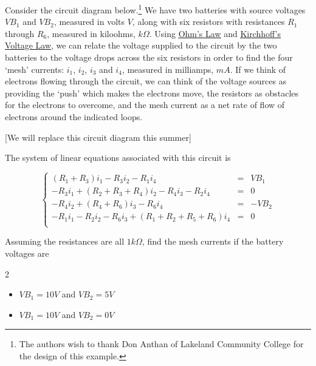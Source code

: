 \documentclass{ximera}
\begin{document}
\begin{example} \label{circuitex} Consider the circuit diagram below.\footnote{The authors wish to thank Don Anthan of Lakeland Community College for the design of this example.}   We have two batteries with source voltages $V\!B_1$ and $V\!B_2$, measured in volts $V$, along with six resistors with resistances $R_1$ through $R_6$, measured in kiloohms, $k\Omega$.  Using \href{http://en.wikipedia.org/wiki/Ohm's_law}{\underline{Ohm's Law}}   and \href{http://en.wikipedia.org/wiki/Kirchhoff's_circuit_laws}{\underline{Kirchhoff's Voltage Law}}, we can relate the voltage supplied to the circuit by the two batteries to the voltage drops across the six resistors in order to find the four `mesh' currents: $i_1$, $i_2$, $i_3$ and $i_4$, measured in milliamps, $mA$.  If we think of electrons flowing through the circuit, we can think of the voltage sources as providing the `push' which makes the electrons move, the resistors as obstacles for the electrons to overcome, and the mesh current as a net rate of flow of electrons around the indicated loops.

[We will replace this circuit diagram this summer]

The system of linear equations associated with this circuit is

\[ \left\{ \begin{array}{rcl} \left(R_1 + R_3\right)i_1 - R_3i_2 - R_1i_4 & = & V\!B_1 \\
-R_3i_1 + \left(R_2 + R_3 + R_4\right)i_2 - R_4i_3 - R_2i_4 & = & 0 \\
-R_4i_2 + \left(R_4 + R_6\right)i_3 - R_6i_4 & = & -V\!B_2 \\
-R_1i_1 - R_2i_2 - R_6i_3 + \left(R_1 + R_2 + R_5 + R_6\right)i_4 & = & 0 \\  \end{array} \right.\]

Assuming the resistances are all $1 k\Omega$, find the mesh currents if the battery voltages are

\begin{multicols}{2}

\begin{itemize}

\item  $V\!B_1 = 10 V$ and $V\!B_2 = 5 V$

\item  $V\!B_1 = 10 V$ and $V\!B_2 = 0 V$


\end{itemize}
\end{multicols}
\end{example}
\end{document}
